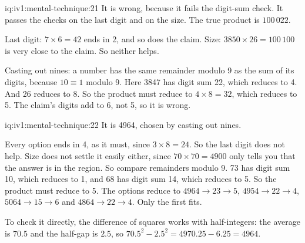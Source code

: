 \begin{solution}{iq:iv1:mental-technique:21}
It is wrong, because it fails the digit-sum check. It passes the checks on the last digit and on the size. The true product is $100\,022$.

Last digit: $7 \times 6 = 42$ ends in 2, and so does the claim. Size: $3850 \times 26 = 100\,100$ is very close to the claim. So neither helps.

Casting out nines: a number has the same remainder modulo 9 as the sum of its digits, because $10 \equiv 1$ modulo 9. Here 3847 has digit sum 22, which reduces to 4. And 26 reduces to 8. So the product must reduce to $4 \times 8 = 32$, which reduces to 5. The claim's digits add to 6, not 5, so it is wrong.

\end{solution}

\begin{solution}{iq:iv1:mental-technique:22}
It is 4964, chosen by casting out nines.

Every option ends in 4, as it must, since $3 \times 8 = 24$. So the last digit does not help. Size does not settle it easily either, since $70 \times 70 = 4900$ only tells you that the answer is in the region. So compare remainders modulo 9. 73 has digit sum 10, which reduces to 1, and 68 has digit sum 14, which reduces to 5. So the product must reduce to 5. The options reduce to $4964 \to 23 \to 5$, $4954 \to 22 \to 4$, $5064 \to 15 \to 6$ and $4864 \to 22 \to 4$. Only the first fits.

To check it directly, the difference of squares works with half-integers: the average is $70.5$ and the half-gap is $2.5$, so $70.5^2 - 2.5^2 = 4970.25 - 6.25 = 4964$.

\end{solution}

